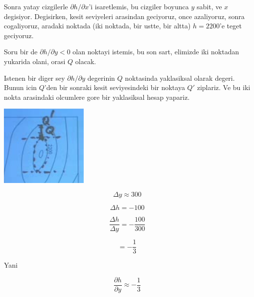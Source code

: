 \documentclass[12pt,fleqn]{article}
\begin{document}
Sonra yatay cizgilerle $\partial h/\partial x$'i isaretlemis, bu cizgiler
boyunca $y$ sabit, ve $x$ degisiyor. Degisirken, kesit seviyeleri arasindan
geciyoruz, once azaliyoruz, sonra cogaliyoruz, aradaki noktada (iki
noktada, bir ustte, bir altta) $h=2200$'e teget geciyoruz. 

Soru bir de  $\partial h/\partial y < 0$ olan noktayi istemis, bu son sart,
elimizde iki noktadan yukarida olani, orasi $Q$ olacak. 

Istenen bir diger sey $\partial h/\partial y$ degerinin $Q$ noktasinda
yaklasiksal olarak degeri. Bunun icin $Q$'den bir sonraki kesit
seviyesindeki bir noktaya $Q'$ ziplariz. Ve bu iki nokta arasindaki
olcumlere gore bir yaklasiksal hesap yapariz. 

\includegraphics[height=4cm]{15_4.png}


\[ \Delta y \approx 300 \]

\[ \Delta h = -100 \]

\[ 
\frac{\Delta h}{\Delta y} = -\frac{100}{300}
 \]

\[ = -\frac{1}{3} \]

Yani 

\[ 
\frac{\partial h}{\partial y} \approx -\frac{1}{3}
 \]
\end{document}
